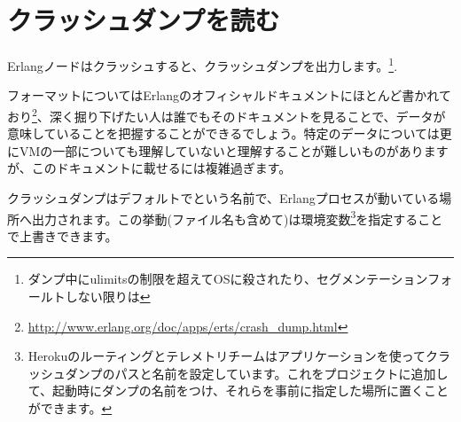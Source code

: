 \chapter{クラッシュダンプを読む}
\label{chap:crash-dumps}

Erlangノードはクラッシュすると、クラッシュダンプを出力します。\footnote{ダンプ中にulimitsの制限を超えてOSに殺されたり、セグメンテーションフォールトしない限りは}.

フォーマットについてはErlangのオフィシャルドキュメントにほとんど書かれており\footnote{\href{http://www.erlang.org/doc/apps/erts/crash\_dump.html}{http://www.erlang.org/doc/apps/erts/crash\_dump.html}}、深く掘り下げたい人は誰でもそのドキュメントを見ることで、データが意味していることを把握することができるでしょう。特定のデータについては更にVMの一部についても理解していないと理解することが難しいものがありますが、このドキュメントに載せるには複雑過ぎます。

クラッシュダンプはデフォルトでという名前で、Erlangプロセスが動いている場所へ出力されます。この挙動(ファイル名も含めて)は環境変数\footnote{Herokuのルーティングとテレメトリチームはアプリケーションを使ってクラッシュダンプのパスと名前を設定しています。これをプロジェクトに追加して、起動時にダンプの名前をつけ、それらを事前に指定した場所に置くことができます。}を指定することで上書きできます。

